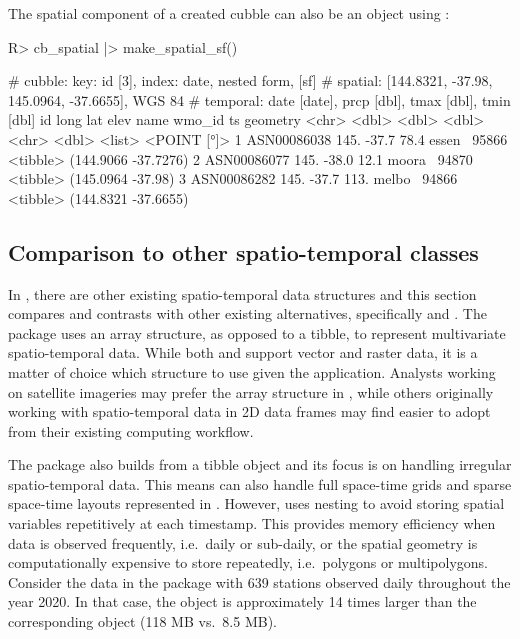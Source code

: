 \documentclass[
  shortnames]{jss}
\begin{document}
The spatial component of a created cubble can also be an  object using :

\begin{CodeChunk}
\begin{CodeInput}
R> cb_spatial |> make_spatial_sf() 
\end{CodeInput}
\begin{CodeOutput}
# cubble:   key: id [3], index: date, nested form, [sf]
# spatial:  [144.8321, -37.98, 145.0964, -37.6655], WGS 84
# temporal: date [date], prcp [dbl], tmax [dbl], tmin [dbl]
  id           long   lat  elev name   wmo_id ts                  geometry
  <chr>       <dbl> <dbl> <dbl> <chr>   <dbl> <list>           <POINT [°]>
1 ASN00086038  145. -37.7  78.4 essen~  95866 <tibble> (144.9066 -37.7276)
2 ASN00086077  145. -38.0  12.1 moora~  94870 <tibble>   (145.0964 -37.98)
3 ASN00086282  145. -37.7 113.  melbo~  94866 <tibble> (144.8321 -37.6655)
\end{CodeOutput}
\end{CodeChunk}

\hypertarget{tidyverse}{%
\subsection{Comparison to other spatio-temporal classes}\label{tidyverse}}

In , there are other existing spatio-temporal data structures and this section compares and contrasts  with other existing alternatives, specifically  and . The  package \citep{stars} uses an array structure, as opposed to a tibble, to represent multivariate spatio-temporal data. While both  and  support vector and raster data, it is a matter of choice which structure to use given the application. Analysts working on satellite imageries may prefer the array structure in , while others originally working with spatio-temporal data in 2D data frames may find  easier to adopt from their existing computing workflow.

The  package \citep{sftime} also builds from a tibble object and its focus is on handling irregular spatio-temporal data. This means  can also handle full space-time grids and sparse space-time layouts represented in . However,  uses nesting to avoid storing spatial variables repetitively at each timestamp. This provides memory efficiency when data is observed frequently, i.e.~daily or sub-daily, or the spatial geometry is computationally expensive to store repeatedly, i.e.~polygons or multipolygons. Consider the  data in the  package with 639 stations observed daily throughout the year 2020. In that case, the  object is approximately 14 times larger than the corresponding  object (118 MB vs.~8.5 MB).
\end{document}

